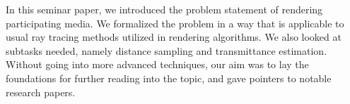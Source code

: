 In this seminar paper, we introduced the problem statement of rendering participating media. We formalized the problem in a way that is applicable to usual ray tracing methods utilized in rendering algorithms. We also looked at subtasks needed, namely distance sampling and transmittance estimation. Without going into more advanced techniques, our aim was to lay the foundations for further reading into the topic, and gave pointers to notable research papers.